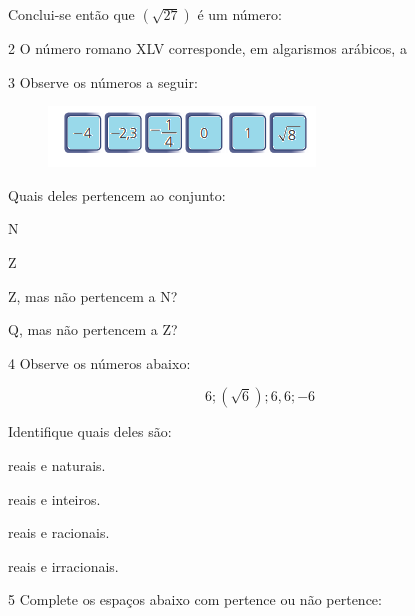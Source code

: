 Conclui-se então que $(\sqrt{27})$ é um número:



\num{2} O número romano XLV corresponde, em algarismos arábicos, a


\num{3} Observe os números a seguir:

\begin{figure}[H]
\centering\includegraphics[width=2.79167in,height=0.63542in]{./imgSAEB_8_MAT/media/image1.png}
\end{figure}

Quais deles pertencem ao conjunto:


\begin{escolha}
\item N 
\item Z 
\item Z, mas não pertencem a N? 
\item Q, mas não pertencem a Z? 
\end{escolha}
\num{4} Observe os números abaixo:

$$6; (\sqrt{6}); 6,6; -6$$


Identifique quais deles são:
\begin{escolha}
\item reais e naturais.
\item reais e inteiros.
\item reais e racionais.
\item reais e irracionais.
\end{escolha}


\num{5} Complete os espaços abaixo com pertence ou não pertence:


